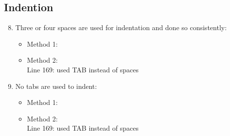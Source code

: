 \subsection{Indention}
\begin{enumerate}
	\setcounter{enumi}{7}
	\item Three or four spaces are used for indentation and done so consistently:
	\begin{itemize}
		\item Method 1: \cmark
		\item Method 2: \xmark\\
		Line 169: used TAB instead of spaces
	\end{itemize}
	\item No tabs are used to indent:
	\begin{itemize}
		\item Method 1: \cmark
		\item Method 2: \xmark\\
		Line 169: used TAB instead of spaces
	\end{itemize}
\end{enumerate}